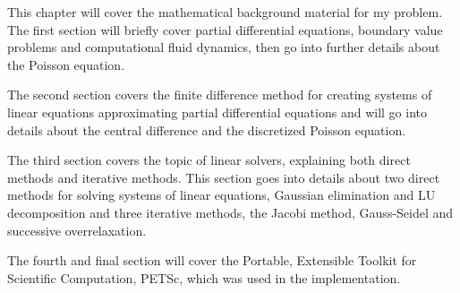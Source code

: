 This chapter will cover the mathematical background material for my problem. The
first section will briefly cover partial differential equations, boundary value
problems and computational fluid dynamics, then go into further details about
the Poisson equation.

The second section covers the finite difference method for creating systems of
linear equations approximating partial differential equations and will go into
details about the central difference and the discretized Poisson equation.

The third section covers the topic of linear solvers, explaining both direct
methods and iterative methods. This section goes into details about two direct
methods for solving systems of linear equations, Gaussian elimination and LU
decomposition and three iterative methods, the Jacobi method, Gauss-Seidel and
successive overrelaxation.

The fourth and final section will cover the Portable, Extensible Toolkit for
Scientific Computation, PETSc, which was used in the implementation.
